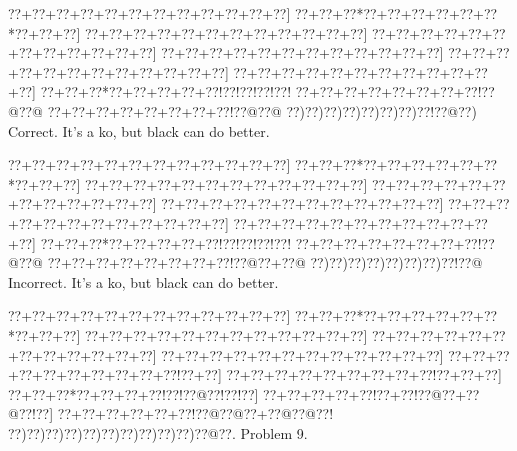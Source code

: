 \documentclass[a5paper]{article}
\begin{document}
\begin{center}
{\goo
\0??+\0??+\0??+\0??+\0??+\0??+\0??+\0??+\0??+\0??+\0??+\0??]
\0??+\0??+\0??*\0??+\0??+\0??+\0??+\0??+\0??*\0??+\0??+\0??]
\0??+\0??+\0??+\0??+\0??+\0??+\0??+\0??+\0??+\0??+\0??+\0??]
\0??+\0??+\0??+\0??+\0??+\0??+\0??+\0??+\0??+\0??+\0??+\0??]
\0??+\0??+\0??+\0??+\0??+\0??+\0??+\0??+\0??+\0??+\0??+\0??]
\0??+\0??+\0??+\0??+\0??+\0??+\0??+\0??+\0??+\0??+\0??+\0??]
\0??+\0??+\0??+\0??+\0??+\0??+\0??+\0??+\0??+\0??+\0??+\0??]
\0??+\0??+\0??*\0??+\0??+\0??+\0??+\0??!\0??!\0??!\0??!\0??!
\0??+\0??+\0??+\0??+\0??+\0??+\0??+\0??!\0??@\0??@
\0??+\0??+\0??+\0??+\0??+\0??+\0??+\0??!\0??@\0??@
\0??)\0??)\0??)\0??)\0??)\0??)\0??)\0??!\0??@\0??)
}
Correct. It's a ko, but black can do better. 

\end{center}
\begin{center}
{\goo
\0??+\0??+\0??+\0??+\0??+\0??+\0??+\0??+\0??+\0??+\0??+\0??]
\0??+\0??+\0??*\0??+\0??+\0??+\0??+\0??+\0??*\0??+\0??+\0??]
\0??+\0??+\0??+\0??+\0??+\0??+\0??+\0??+\0??+\0??+\0??+\0??]
\0??+\0??+\0??+\0??+\0??+\0??+\0??+\0??+\0??+\0??+\0??+\0??]
\0??+\0??+\0??+\0??+\0??+\0??+\0??+\0??+\0??+\0??+\0??+\0??]
\0??+\0??+\0??+\0??+\0??+\0??+\0??+\0??+\0??+\0??+\0??+\0??]
\0??+\0??+\0??+\0??+\0??+\0??+\0??+\0??+\0??+\0??+\0??+\0??]
\0??+\0??+\0??*\0??+\0??+\0??+\0??+\0??!\0??!\0??!\0??!\0??!
\0??+\0??+\0??+\0??+\0??+\0??+\0??+\0??!\0??@\0??@
\0??+\0??+\0??+\0??+\0??+\0??+\0??+\0??!\0??@\0??+\0??@
\0??)\0??)\0??)\0??)\0??)\0??)\0??)\0??!\0??@
}
Incorrect. It's a ko, but black can do better. 

\end{center}
\newpage
\begin{center}
{\goo
\0??+\0??+\0??+\0??+\0??+\0??+\0??+\0??+\0??+\0??+\0??+\0??]
\0??+\0??+\0??*\0??+\0??+\0??+\0??+\0??+\0??*\0??+\0??+\0??]
\0??+\0??+\0??+\0??+\0??+\0??+\0??+\0??+\0??+\0??+\0??+\0??]
\0??+\0??+\0??+\0??+\0??+\0??+\0??+\0??+\0??+\0??+\0??+\0??]
\0??+\0??+\0??+\0??+\0??+\0??+\0??+\0??+\0??+\0??+\0??+\0??]
\0??+\0??+\0??+\0??+\0??+\0??+\0??+\0??+\0??+\0??!\0??+\0??]
\0??+\0??+\0??+\0??+\0??+\0??+\0??+\0??+\0??!\0??+\0??+\0??]
\0??+\0??+\0??*\0??+\0??+\0??+\0??!\0??!\0??@\0??!\0??!\0??]
\0??+\0??+\0??+\0??+\0??!\0??+\0??!\0??@\0??+\0??@\0??!\0??]
\0??+\0??+\0??+\0??+\0??+\0??!\0??@\0??@\0??+\0??@\0??@\0??!
\0??)\0??)\0??)\0??)\0??)\0??)\0??)\0??)\0??)\0??)\0??@\0??.
}
Problem 9.

\end{center}
\end{document}
